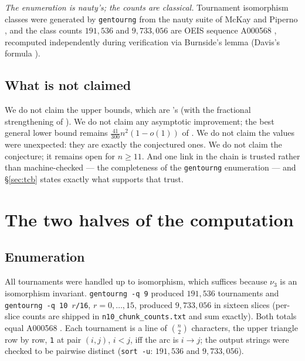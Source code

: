 \documentclass[11pt]{amsart}
\newcommand{\nut}{\nu_3}
\theoremstyle{plain}
\theoremstyle{definition}
\theoremstyle{remark}
\begin{document}
\emph{The enumeration is nauty's; the counts are classical.} Tournament
isomorphism classes were generated by \texttt{gentourng} from the nauty
suite of McKay and Piperno \cite{nauty}, and the class counts
$191{,}536$ and $9{,}733{,}056$ are OEIS sequence A000568 \cite{OEIS},
recomputed independently during verification via Burnside's lemma
(Davis's formula \cite{Davis54}).

\subsection{What is not claimed}
We do not claim the upper bounds, which are \cite{Yuster04}'s (with the
fractional strengthening of \cite{KY08}). We do not claim any asymptotic
improvement; the best general lower bound remains
$\frac{41}{300}n^{2}(1-o(1))$ of \cite{KY08}. We do not claim the values
were unexpected: they are exactly the conjectured ones. We do not claim
the conjecture; it remains open for $n\ge11$. And one link in the chain
is trusted rather than machine-checked --- the completeness of the
\texttt{gentourng} enumeration --- and \S\ref{sec:tcb} states exactly
what supports that trust.

\section{The two halves of the computation}\label{sec:comp}

\subsection{Enumeration}\label{ssec:enum}
All tournaments were handled up to isomorphism, which suffices because
$\nut$ is an isomorphism invariant. \texttt{gentourng -q 9} produced
$191{,}536$ tournaments and \texttt{gentourng -q 10 $r$/16},
$r=0,\dots,15$, produced $9{,}733{,}056$ in sixteen slices (per-slice
counts are shipped in \texttt{n10\_chunk\_counts.txt} and sum exactly).
Both totals equal A000568 \cite{OEIS}. Each tournament is a line of
$\binom{n}{2}$ characters, the upper triangle row by row, \texttt{1} at
pair $(i,j)$, $i<j$, iff the arc is $i\to j$; the output strings were
checked to be pairwise distinct (\texttt{sort -u}: $191{,}536$ and
$9{,}733{,}056$).
\end{document}
